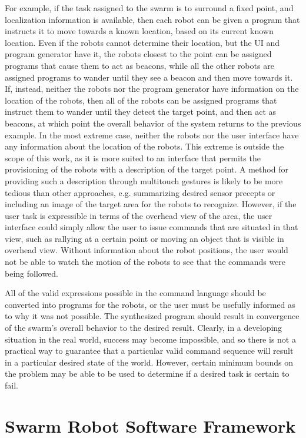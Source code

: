 For example, if the task assigned to the swarm is to surround a fixed point, and localization information is available, then each robot can be given a program that instructs it to move towards a known location, based on its current known location.
Even if the robots cannot determine their location, but the UI and program generator have it, the robots closest to the point can be assigned programs that cause them to act as beacons, while all the other robots are assigned programs to wander until they see a beacon and then move towards it. 
If, instead, neither the robots nor the program generator have information on the location of the robots, then all of the robots can be assigned programs that instruct them to wander until they detect the target point, and then act as beacons, at which point the overall behavior of the system returns to the previous example.
In the most extreme case, neither the robots nor the user interface have any information about the location of the robots. 
This extreme is outside the scope of this work, as it is more suited to an interface that permits the provisioning of the robots with a description of the target point. 
A method for providing such a description through multitouch gestures is likely to be more tedious than other approaches, e.g. summarizing desired sensor precepts or including an image of the target area for the robots to recognize. 
However, if the user task is expressible in terms of the overhead view of the area, the user interface could simply allow the user to issue commands that are situated in that view, such as rallying at a certain point or moving an object that is visible in overhead view. 
Without information about the robot positions, the user would not be able to watch the motion of the robots to see that the commands were being followed. 

All of the valid expressions possible in the command language should be converted into programs for the robots, or the user must be usefully informed as to why it was not possible. 
The synthesized program should result in convergence of the swarm's overall behavior to the desired result. 
Clearly, in a developing situation in the real world, success may become impossible, and so there is not a practical way to guarantee that a particular valid command sequence will result in a particular desired state of the world. 
However, certain minimum bounds on the problem may be able to be used to determine if a desired task is certain to fail. 

\section{Swarm Robot Software Framework}

